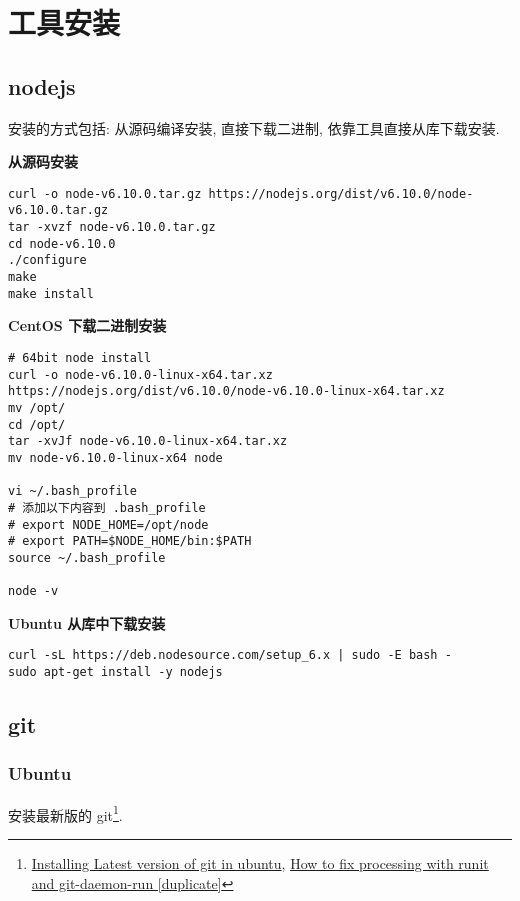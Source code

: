 \section{工具安装}\label{ux5de5ux5177ux5b89ux88c5}

\subsection{nodejs}\label{nodejs}

安装的方式包括: 从源码编译安装, 直接下载二进制,
依靠工具直接从库下载安装.

\textbf{从源码安装}

\begin{lstlisting}
curl -o node-v6.10.0.tar.gz https://nodejs.org/dist/v6.10.0/node-v6.10.0.tar.gz
tar -xvzf node-v6.10.0.tar.gz
cd node-v6.10.0
./configure
make
make install
\end{lstlisting}

\textbf{CentOS 下载二进制安装}

\begin{lstlisting}
# 64bit node install
curl -o node-v6.10.0-linux-x64.tar.xz https://nodejs.org/dist/v6.10.0/node-v6.10.0-linux-x64.tar.xz
mv /opt/
cd /opt/
tar -xvJf node-v6.10.0-linux-x64.tar.xz
mv node-v6.10.0-linux-x64 node

vi ~/.bash_profile
# 添加以下内容到 .bash_profile
# export NODE_HOME=/opt/node
# export PATH=$NODE_HOME/bin:$PATH
source ~/.bash_profile

node -v
\end{lstlisting}

\textbf{Ubuntu 从库中下载安装}

\begin{lstlisting}
curl -sL https://deb.nodesource.com/setup_6.x | sudo -E bash -
sudo apt-get install -y nodejs
\end{lstlisting}

\subsection{git}\label{git}

\subsubsection{Ubuntu}\label{ubuntu}

安装最新版的 git\footnote{\href{http://stackoverflow.com/questions/19109542/installing-latest-version-of-git-in-ubuntu/19109661\#19109661}{Installing
  Latest version of git in ubuntu},
  \href{http://askubuntu.com/questions/765565/how-to-fix-processing-with-runit-and-git-daemon-run/772095\#772095}{How
  to fix processing with runit and git-daemon-run {[}duplicate{]}}}.

